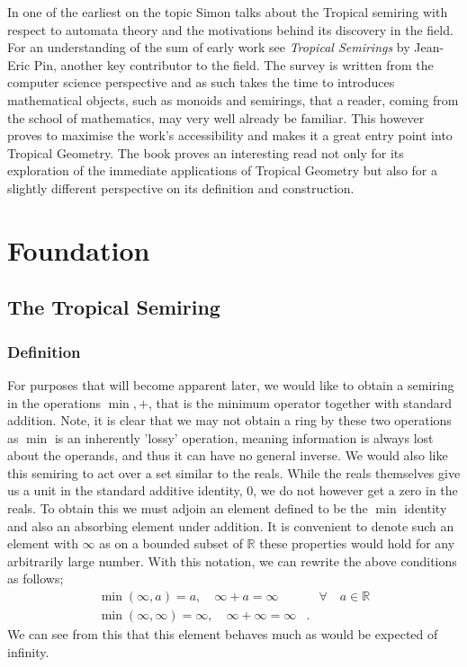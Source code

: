 \documentclass[12pt,a4paper]{amsart}
\newcommand{\R}{\mathbb{R}}
\theoremstyle{definition}
\theoremstyle{remark}
\begin{document}
In one of the earliest on the topic\cite{10.1007/BFb0017135} Simon talks about the Tropical semiring with respect to automata theory and the motivations behind its discovery in the field.
For an understanding of the sum of early work see \textit{Tropical Semirings}\cite{pin1998tropical} by Jean-Eric Pin, another key contributor to the field.
The survey is written from the computer science perspective and as such takes the time to introduces mathematical objects, such as monoids and semirings, that a reader, coming from the school of mathematics, may very well already be familiar.
This however proves to maximise the work's accessibility and makes it a great entry point into Tropical Geometry.
The book proves an interesting read not only for its exploration of the immediate applications of Tropical Geometry but also for a slightly different perspective on its definition and construction.

\newpage
\section{Foundation}
\subsection{The Tropical Semiring}
\subsubsection{Definition}
For purposes that will become apparent later, we would like to obtain a semiring in the operations $\min, +$, that is the minimum operator together with standard addition. Note, it is clear that we may not obtain a ring by these two operations as $\min$ is an inherently 'lossy' operation, meaning information is always lost about the operands, and thus it can have no general inverse. We would also like this semiring to act over a set similar to the reals. While the reals themselves give us a unit in the standard additive identity, $0$, we do not however get a zero in the reals. To obtain this we must adjoin an element defined to be the $\min$ identity and also an absorbing element under addition. It is convenient to denote such an element with $\infty$ as on a bounded subset of $\R$ these properties would hold for any arbitrarily large number. With this notation, we can rewrite the above conditions as follows;
\begin{equation}
    \begin{aligned}
        \min(\infty, a) = a,\quad \infty + a = \infty&\quad\forall\quad a\in\R \\
        \min(\infty, \infty) = \infty,\quad \infty + \infty = \infty&.
    \end{aligned}
\end{equation}
We can see from this that this element behaves much as would be expected of infinity.
\end{document}
